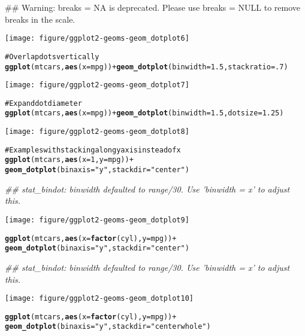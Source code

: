 \documentclass[a4paper,titlepage]{tufte-handout}\usepackage{graphicx, color}
\makeatletter
\def\maxwidth{ %
  \ifdim\Gin@nat@width>\linewidth
    \linewidth
  \else
    \Gin@nat@width
  \fi
}
\newcommand{\hlfunctioncall}[1]{\textcolor[rgb]{0.501960784313725,0,0.329411764705882}{\textbf{#1}}}%
\newcommand{\hlstring}[1]{\textcolor[rgb]{0.6,0.6,1}{#1}}%
\newcommand{\hlcomment}[1]{\textcolor[rgb]{0.180392156862745,0.6,0.341176470588235}{#1}}%
\newenvironment{kframe}{%
 \def\at@end@of@kframe{}%
 \ifinner\ifhmode%
  \def\at@end@of@kframe{\end{minipage}}%
  \begin{minipage}{\columnwidth}%
 \fi\fi%
 \def\FrameCommand##1{\hskip\@totalleftmargin \hskip-\fboxsep
 \colorbox{shadecolor}{##1}\hskip-\fboxsep
     \hskip-\linewidth \hskip-\@totalleftmargin \hskip\columnwidth}%
 \MakeFramed {\advance\hsize-\width
   \@totalleftmargin\z@ \linewidth\hsize
   \@setminipage}}%
 {\par\unskip\endMakeFramed%
 \at@end@of@kframe}
\newenvironment{knitrout}{}{} %
\makeatother
\begin{document}
\begin{knitrout}
\begin{kframe}
{\ttfamily\noindent\textcolor{warningcolor}{\#\# Warning: breaks = NA is deprecated. Please use breaks = NULL to remove breaks in the scale.}}\end{kframe}\texttt{[image: figure/ggplot2-geoms-geom\_dotplot6]} \begin{kframe}\begin{alltt}
\hlcomment{# Overlap dots vertically}
\hlfunctioncall{ggplot}(mtcars, \hlfunctioncall{aes}(x = mpg)) + \hlfunctioncall{geom_dotplot}(binwidth = 1.5, stackratio = .7)
\end{alltt}
\end{kframe}\texttt{[image: figure/ggplot2-geoms-geom\_dotplot7]} \begin{kframe}\begin{alltt}
\hlcomment{# Expand dot diameter}
\hlfunctioncall{ggplot}(mtcars, \hlfunctioncall{aes}(x  =mpg)) + \hlfunctioncall{geom_dotplot}(binwidth = 1.5, dotsize = 1.25)
\end{alltt}
\end{kframe}\texttt{[image: figure/ggplot2-geoms-geom\_dotplot8]} \begin{kframe}\begin{alltt}
\hlcomment{# Examples with stacking along y axis instead of x}
\hlfunctioncall{ggplot}(mtcars, \hlfunctioncall{aes}(x = 1, y = mpg)) +
  \hlfunctioncall{geom_dotplot}(binaxis = \hlstring{"y"}, stackdir = \hlstring{"center"})
\end{alltt}


{\ttfamily\noindent\itshape\textcolor{messagecolor}{\#\# stat\_bindot: binwidth defaulted to range/30. Use 'binwidth = x' to adjust this.}}\end{kframe}\texttt{[image: figure/ggplot2-geoms-geom\_dotplot9]} \begin{kframe}\begin{alltt}
\hlfunctioncall{ggplot}(mtcars, \hlfunctioncall{aes}(x = \hlfunctioncall{factor}(cyl), y = mpg)) +
  \hlfunctioncall{geom_dotplot}(binaxis = \hlstring{"y"}, stackdir = \hlstring{"center"})
\end{alltt}


{\ttfamily\noindent\itshape\textcolor{messagecolor}{\#\# stat\_bindot: binwidth defaulted to range/30. Use 'binwidth = x' to adjust this.}}\end{kframe}\texttt{[image: figure/ggplot2-geoms-geom\_dotplot10]} \begin{kframe}\begin{alltt}
\hlfunctioncall{ggplot}(mtcars, \hlfunctioncall{aes}(x = \hlfunctioncall{factor}(cyl), y = mpg)) +
  \hlfunctioncall{geom_dotplot}(binaxis = \hlstring{"y"}, stackdir = \hlstring{"centerwhole"})
\end{alltt}



\end{kframe}
\end{knitrout}
\end{document}
